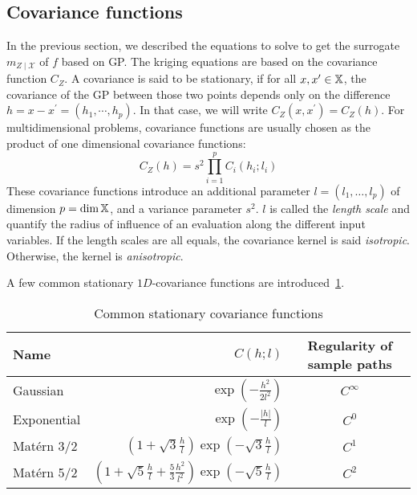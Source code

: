 \documentclass[../../Main_ManuscritThese.tex]{subfiles}
\begin{document}
\subsection{Covariance functions}
\label{sec:cov_fun}
In the previous section, we described the equations to solve to get
the surrogate $m_{Z\mid \mathcal{X}}$ of $f$ based on GP.  The kriging
equations are based on the covariance function $C_Z$.  A covariance is
said to be stationary, if for all $x, x^{\prime} \in \mathbb{X}$, the
covariance of the GP between those two points depends only on the
difference $h = x-x^{\prime}=(h_1,\cdots, h_{p})$. In that case, we
will write $C_Z(x, x^{\prime}) = C_Z(h)$.  For multidimensional
problems, covariance functions are usually chosen as the product of
one dimensional covariance functions:
\begin{equation}
  C_Z(h) = s^2\prod_{i=1}^{p} C_i(h_i;l_i)
\end{equation}
These covariance functions introduce an additional parameter
$l=(l_1,\dots,l_p)$ of dimension $p=\dim \mathbb{X}$, and a variance
parameter $s^2$.  $l$ is called the \emph{length scale} and quantify
the radius of influence of an evaluation along the different input
variables. If the length scales are all equals, the covariance kernel
is said \emph{isotropic}. Otherwise, the kernel is \emph{anisotropic}.

A few common stationary $1D$-covariance functions are introduced~\cref{tab:common_cov_fc}.

  \begin{table}[ht]
    \centering 
    \begin{tabular}{lrc}
      \toprule
      Name        & $C(h;l)$                                                                                                 & Regularity of sample paths \\ \midrule
      Gaussian    & $\exp\left(- \frac{h^2}{2 l^2}\right)$                                                                   & $C^{\infty}$               \\
      Exponential & $\exp\left(- \frac{\lvert h \rvert}{l}\right)$                                                           & $C^0$                      \\
      Matérn 3/2  & $\left(1 + \sqrt{3}\frac{h}{l}\right)\exp\left(-\sqrt{3}\frac{h}{l}\right)$                              & $C^1$                      \\
      Matérn 5/2  & $\left(1+ \sqrt{5}\frac{h}{l} + \frac{5}{3}\frac{h^2}{l^2}\right) \exp\left(-\sqrt{5}\frac{h}{l}\right)$ & $C^2$                      \\ \bottomrule
    \end{tabular}
    \caption{\label{tab:common_cov_fc} Common stationary covariance functions}
  \end{table}
\end{document}
